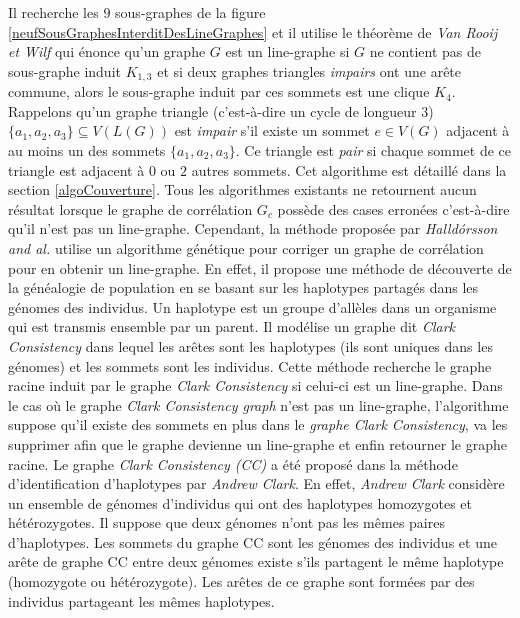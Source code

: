 Il recherche les $9$ sous-graphes de la figure \ref{neufSousGraphesInterditDesLineGraphes} et il utilise le th\'eor\`eme de {\em Van Rooij et Wilf} \cite{ROOIJetWILF1965interchange} qui \'enonce qu'un graphe $G$ est un line-graphe si $G$ ne contient pas de sous-graphe induit $K_{1,3}$ et si deux graphes triangles  {\em impairs} ont une ar\^ete commune, alors le sous-graphe induit par ces sommets est une clique $K_4$. 
Rappelons qu'un graphe triangle (c'est-\`a-dire un cycle de longueur $3$) $\{a_1,a_2,a_3\} \subseteq V(L(G))$ est {\em impair} s'il existe un sommet $e \in V(G)$ adjacent \`a  au moins un des sommets $\{a_1, a_2, a_3\}$. Ce triangle est {\em pair} si chaque sommet de ce triangle est adjacent \`a $0$ ou $2$ autres sommets. Cet algorithme est d\'etaill\'e dans la section \ref{algoCouverture}.
\newline
Tous les algorithmes existants ne retournent  aucun r\'esultat lorsque le graphe  de corr\'elation $G_c$ poss\`ede des cases erron\'ees c'est-\`a-dire qu'il n'est pas un line-graphe. 
Cependant, la m\'ethode propos\'ee par {\em Halld{\'o}rsson and al.} \cite{Halldorsson2013} 
utilise un algorithme g\'en\'etique pour corriger un graphe de corr\'elation pour en obtenir un line-graphe. 
En effet, il propose une m\'ethode de d\'ecouverte de la g\'en\'ealogie de population en se basant sur les haplotypes partag\'es dans les g\'enomes des individus.  
Un haplotype est un groupe d'all\`eles dans un organisme qui est transmis ensemble par un parent.
Il mod\'elise un graphe dit {\em Clark Consistency} \cite{halldorsson2011clark} dans lequel les ar\^etes sont les haplotypes (ils sont uniques dans les g\'enomes) et les sommets sont les individus.
Cette m\'ethode recherche le graphe racine induit par le graphe {\em Clark Consistency} si celui-ci est un line-graphe. Dans le cas o\`u le graphe {\em Clark Consistency graph} n'est pas un line-graphe, l'algorithme suppose qu'il existe des sommets en plus dans le {\em graphe Clark Consistency}, va les supprimer afin que le graphe devienne un line-graphe et enfin retourner le graphe racine.     
Le graphe {\em Clark Consistency (CC)} a \'et\'e propos\'e dans  la m\'ethode d'identification d'haplotypes par {\em Andrew Clark}. 
En effet, {\em Andrew Clark} consid\`ere un ensemble de g\'enomes d'individus qui ont des haplotypes homozygotes et h\'et\'erozygotes. Il suppose que deux g\'enomes n'ont pas les m\^emes paires d'haplotypes. Les sommets du graphe CC sont les g\'enomes des individus et une ar\^ete de graphe CC entre deux g\'enomes existe s'ils partagent le m\^eme haplotype (homozygote ou h\'et\'erozygote). Les ar\^etes de ce graphe sont form\'ees par des individus partageant les m\^emes haplotypes. 
